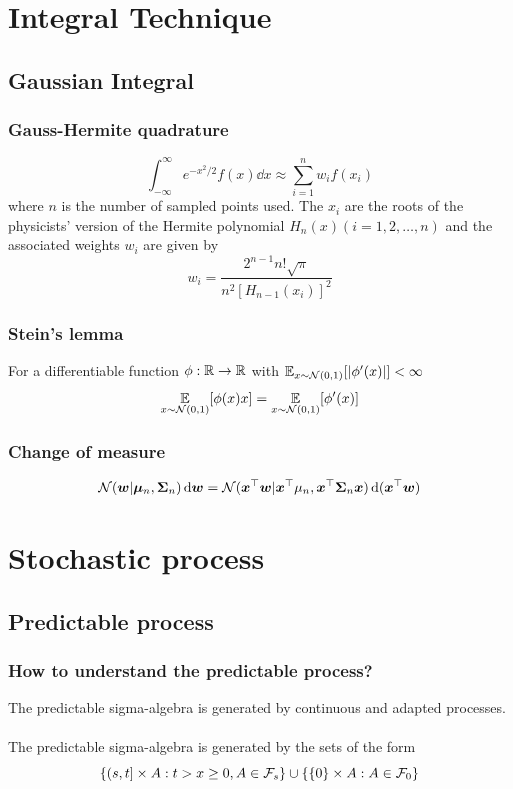 \documentclass[10pt]{article}
\begin{document}
\section{Integral Technique}
\subsection{Gaussian Integral}
\subsubsection{Gauss-Hermite quadrature}
\begin{equation}
    \int_{-\infty}^{\infty} e^{-x^2/2} f(x)\dd{x} \approx  \sum_{i=1}^n w_i f(x_i)
\end{equation}
where $n$ is the number of sampled points used. The $x_i$ are the roots of the physicists' version of the Hermite polynomial $H_n (x) (i=1,2,\dots,n)$ and the associated weights $w_i$ are given by 
\begin{equation}
    w_i = \frac{2^{n-1}n! \sqrt{\pi}}{n^2[H_{n-1}(x_i)]^2}
\end{equation}

\subsubsection{Stein's lemma} 
For a differentiable function $\phi: \mathbb{R} \to \mathbb{R}$ with $\mathop{\mathbb{E} \displaystyle}_{x \sim \mathcal{N}(0, 1)} [ | \phi^{\prime} (x) | ] < \infty$
\begin{equation}
    \mathop{\mathbb{E} \displaystyle}_{x \sim \mathcal{N}(0,1)} [ \phi (x) x] = \mathop{\mathbb{E} \displaystyle}_{x \sim \mathcal{N}(0,1)} [ \phi^{\prime} (x)]
\end{equation}
\subsubsection{Change of measure}
\begin{equation}
    \mathcal{N}({\bm{w}} | {\bm{\mu}}_n, {\bm{\Sigma}}_n) \,\mathrm{d}{\bm{w}} = \mathcal{N}({\bm{x}}^{\top} {\bm{w}} | {\bm{x}}^{\top} \mu_n, {\bm{x}}^{\top} {\bm{\Sigma}}_n {\bm{x}}) \,\mathrm{d}({\bm{x}}^{\top} {\bm{w}}) 
\end{equation}
\section{Stochastic process}
\subsection{Predictable process}
\subsubsection{How to understand the predictable process?}
 The predictable sigma-algebra is generated by continuous and adapted processes. \\~\\
 The predictable sigma-algebra is generated by the sets of the form 
\begin{equation}
    \left\{ (s,t] \times A: t > x \geq 0 , A \in \mathcal{F}_s \right\} \cup \left\{ \left\{ 0 \right\} \times A : A \in \mathcal{F}_0 \right\}
\end{equation}
\end{document}
